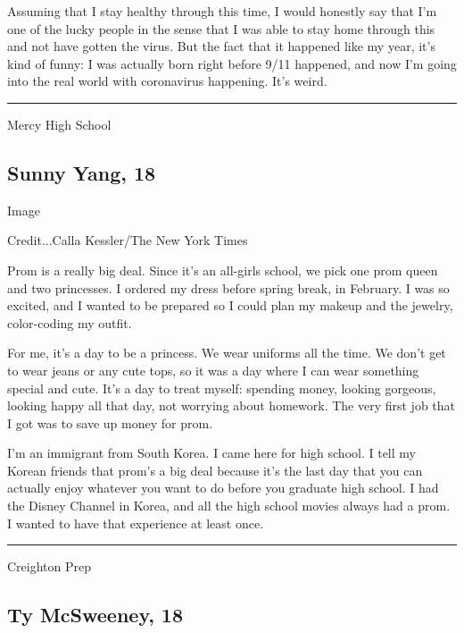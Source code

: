 Assuming that I stay healthy through this time, I would honestly say
that I'm one of the lucky people in the sense that I was able to stay
home through this and not have gotten the virus. But the fact that it
happened like my year, it's kind of funny: I was actually born right
before 9/11 happened, and now I'm going into the real world with
coronavirus happening. It's weird.

\begin{center}\rule{0.5\linewidth}{\linethickness}\end{center}

Mercy High School

\hypertarget{sunny-yang-18}{%
\subsection{Sunny Yang, 18}\label{sunny-yang-18}}

Image

Credit...Calla Kessler/The New York Times

Prom is a really big deal. Since it's an all-girls school, we pick one
prom queen and two princesses. I ordered my dress before spring break,
in February. I was so excited, and I wanted to be prepared so I could
plan my makeup and the jewelry, color-coding my outfit.

For me, it's a day to be a princess. We wear uniforms all the time. We
don't get to wear jeans or any cute tops, so it was a day where I can
wear something special and cute. It's a day to treat myself: spending
money, looking gorgeous, looking happy all that day, not worrying about
homework. The very first job that I got was to save up money for prom.

I'm an immigrant from South Korea. I came here for high school. I tell
my Korean friends that prom's a big deal because it's the last day that
you can actually enjoy whatever you want to do before you graduate high
school. I had the Disney Channel in Korea, and all the high school
movies always had a prom. I wanted to have that experience at least
once.

\begin{center}\rule{0.5\linewidth}{\linethickness}\end{center}

Creighton Prep

\hypertarget{ty-mcsweeney-18}{%
\subsection{Ty McSweeney, 18}\label{ty-mcsweeney-18}}

